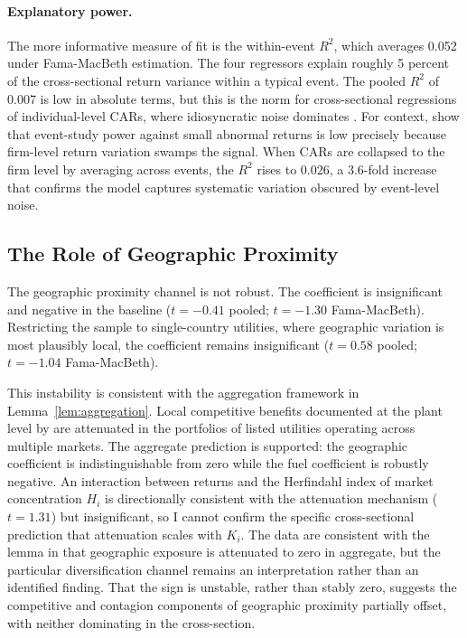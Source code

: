 \documentclass[12pt,a4paper]{article}
\begin{document}
\paragraph{Explanatory power.} The more informative measure of fit is the within-event $R^2$, which averages 0.052 under Fama-MacBeth estimation. The four regressors explain roughly 5 percent of the cross-sectional return variance within a typical event. The pooled $R^2$ of 0.007 is low in absolute terms, but this is the norm for cross-sectional regressions of individual-level CARs, where idiosyncratic noise dominates \citep{CampbellLoMacKinlay1997}. For context, \citet{BrownWarner1985} show that event-study power against small abnormal returns is low precisely because firm-level return variation swamps the signal. When CARs are collapsed to the firm level by averaging across events, the $R^2$ rises to 0.026, a 3.6-fold increase that confirms the model captures systematic variation obscured by event-level noise.



\subsection{The Role of Geographic Proximity}\label{sec:geo_role}

The geographic proximity channel is not robust. The coefficient is insignificant and negative in the baseline ($t = -0.41$ pooled; $t = -1.30$ Fama-MacBeth). Restricting the sample to single-country utilities, where geographic variation is most plausibly local, the coefficient remains insignificant ($t = 0.58$ pooled; $t = -1.04$ Fama-MacBeth).

This instability is consistent with the aggregation framework in Lemma~\ref{lem:aggregation}. Local competitive benefits documented at the plant level by \citet{DavisHausman2016} are attenuated in the portfolios of listed utilities operating across multiple markets. The aggregate prediction is supported: the geographic coefficient is indistinguishable from zero while the fuel coefficient is robustly negative. An interaction between returns and the Herfindahl index of market concentration $H_i$ is directionally consistent with the attenuation mechanism ($t = 1.31$) but insignificant, so I cannot confirm the specific cross-sectional prediction that attenuation scales with $K_i$. The data are consistent with the lemma in that geographic exposure is attenuated to zero in aggregate, but the particular diversification channel remains an interpretation rather than an identified finding. That the sign is unstable, rather than stably zero, suggests the competitive and contagion components of geographic proximity \citep{LangStulz1992} partially offset, with neither dominating in the cross-section.
\end{document}
